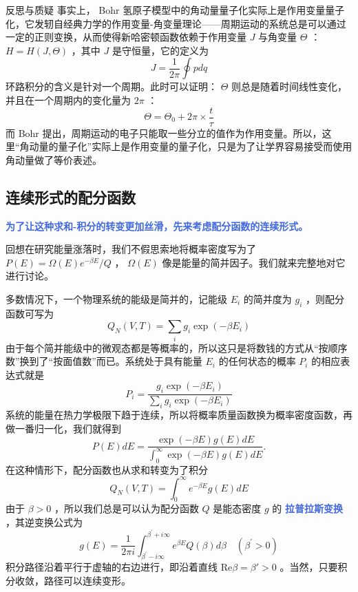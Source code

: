 \begin{justification}{\kaishu 反思与质疑}
    \kaishu \fontsize{11pt}{16pt}
    \quad\quad 事实上， Bohr 氢原子模型中的角动量量子化实际上是作用变量量子化，它发轫自经典力学的作用变量-角变量理论——周期运动的系统总是可以通过一定的正则变换，从而使得新哈密顿函数依赖于作用变量 $J$ 与角变量 $\Theta$ ：$H = H(J,\Theta)$ ，其中 $J$ 是守恒量，它的定义为
    \[
        J = \frac{1}{2\pi} \oint pdq
    \]
    环路积分的含义是针对一个周期。此时可以证明： $\Theta$ 则总是随着时间线性变化，并且在一个周期内的变化量为 $2\pi$ ：
    \[
        \Theta = \Theta_0 + 2\pi \times \frac{t}{\tau} 
    \]
    而 Bohr 提出，周期运动的电子只能取一些分立的值作为作用变量。所以，这里“角动量的量子化”实际上是作用变量的量子化，只是为了让学界容易接受而使用角动量做了等价表述。
\end{justification}    

\subsection{连续形式的配分函数}
\textcolor{RoyalBlue}{\textbf{\kaishu 为了让这种求和-积分的转变更加丝滑，先来考虑配分函数的连续形式。}}

回想在研究能量涨落时，我们不假思索地将概率密度写为了 $P(E) = \Omega(E)e^{-\beta E}/Q$ ， $\Omega(E)$ 像是能量的简并因子。我们就来完整地对它进行讨论。

多数情况下，一个物理系统的能级是简并的，记能级 $E_i$ 的简并度为 $g_i$ ，则配分函数可写为
\begin{equation}
    Q_N(V, T)=\sum_i g_i \exp \left(-\beta E_i\right)
\end{equation}
由于每个简并能级中的微观态都是等概率的，所以这只是将数钱的方式从“按顺序数”换到了“按面值数”而已。系统处于具有能量 $E_i$ 的任何状态的概率 $P_i$ 的相应表达式就是
\begin{equation}
    P_i=\frac{g_i \exp \left(-\beta E_i\right)}{\displaystyle\sum_i g_i \exp \left(-\beta E_i\right)}
\end{equation}
系统的能量在热力学极限下趋于连续，所以将概率质量函数换为概率密度函数，再做一番归一化，我们就得到
\begin{equation}
    P(E) d E=\frac{\exp (-\beta E) g(E) d E}{\displaystyle\int_0^{\infty} \exp (-\beta E) g(E) d E} .
\end{equation}
在这种情形下，配分函数也从求和转变为了积分
\begin{equation}
    Q_N(V, T)=\int_0^{\infty} e^{-\beta E} g(E) d E
\end{equation}
由于 $\beta>0$ ，所以我们总是可以认为配分函数 $Q$ 是能态密度 $g$ 的 \textcolor{RoyalBlue}{\textbf{\kaishu 拉普拉斯变换}} ，其逆变换公式为
\begin{equation}
    g(E)=\frac{1}{2 \pi i} \int_{\beta^{\prime}-i \infty}^{\beta^{\prime}+i \infty} e^{\beta E} Q(\beta) d \beta \quad\left(\beta^{\prime}>0\right)
\end{equation}
积分路径沿着平行于虚轴的右边进行，即沿着直线 $\text{Re}\beta = \beta' >0$ 。当然，只要积分收敛，路径可以连续变形。

